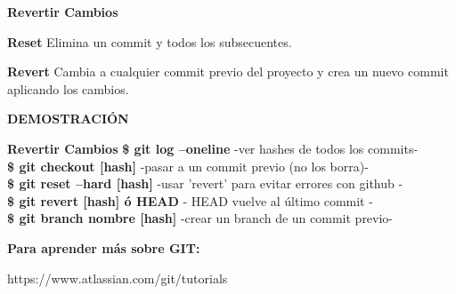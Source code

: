 \documentclass{beamer}
\begin{document}
	\begin{frame}
	\textbf{Revertir Cambios} \vspace{.5cm} 
		\begin{block}{\textbf{Reset}}
			Elimina un commit y todos los subsecuentes.
		\end{block}	
		\vspace{.5cm}
		\begin{block}{\textbf{Revert}}
			Cambia a cualquier commit previo del proyecto y crea un nuevo commit aplicando los cambios.
		\end{block}	


	\end{frame}

	\begin{frame}
		\textbf{DEMOSTRACIÓN} 
		\begin{block}{\textbf{Revertir Cambios}}
			\vspace{0.15cm}
			\normalsize \textbf{\$ git log --oneline}   \small -ver hashes de todos los commits- \\
			\vspace{0.15cm}
			\normalsize \textbf{\$ git checkout [hash] }    \small -pasar a un commit previo (no los borra)-\\
			\vspace{0.15cm}
			\normalsize \textbf{\$ git reset --hard [hash] }\small -usar 'revert' para evitar errores con github -\\
			\vspace{0.15cm}
			\normalsize \textbf{\$ git revert [hash] ó HEAD }\small - HEAD vuelve al último commit -\\
			\vspace{0.15cm}
			\normalsize \textbf{\$ git branch nombre [hash]} \small -crear un branch de un commit previo-\\
			\vspace{0.3cm}
			
		\end{block}	
	\end{frame}



	\begin{frame}
		\textbf{Para aprender más sobre GIT:} \\
		\vspace{1cm}
		\begin{center}
			https://www.atlassian.com/git/tutorials
		\end{center}

	\end{frame}
\end{document}
